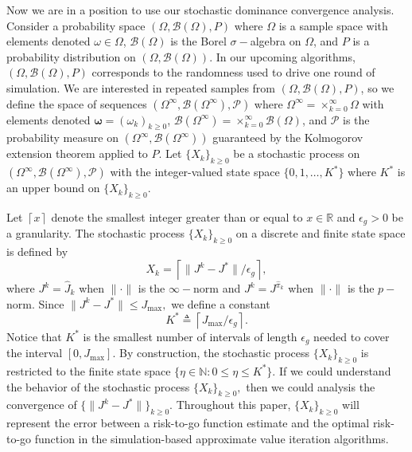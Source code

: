 \documentclass[12pt,technote,onecolumn]{IEEEtran}
\begin{document}
Now we are in a position to use our stochastic dominance convergence
analysis. Consider a probability space $(\Omega,\mathcal{B}(\Omega),P)$
where $\Omega$ is a sample space with elements denoted $\omega\in\Omega$,
$\mathcal{B}\left(\Omega\right)$ is the Borel $\sigma-$algebra on
$\Omega$, and $P$ is a probability distribution on $\left(\Omega,\mathcal{B}(\Omega)\right)$.
In our upcoming algorithms, $\left(\Omega,\mathcal{B}(\Omega),P\right)$
corresponds to the randomness used to drive one round of simulation.
We are interested in repeated samples from $\left(\Omega,\mathcal{B}(\Omega),P\right)$,
so we define the space of sequences $(\Omega^{\infty},\mathcal{B}(\Omega^{\infty}),\mathcal{P})$
where $\Omega^{\infty}=\times_{k=0}^{\infty}\Omega$ with elements
denoted $\boldsymbol{\omega}=(\omega_{k})_{k\geq0}$, $\mathcal{B}(\Omega^{\infty})=\times_{k=0}^{\infty}\mathcal{B}(\Omega)$,
and $\mathcal{P}$ is the probability measure on $(\Omega^{\infty},\mathcal{B}(\Omega^{\infty}))$
guaranteed by the Kolmogorov extension theorem applied to $P$. Let
$\{ X_{k}\} _{k\geq0}$ be a stochastic process on $(\Omega^{\infty},\mathcal{B}(\Omega^{\infty}),\mathcal{P})$
with the integer-valued state space $\{ 0,1,\ldots,K^{*}\} $
where $K^{*}$ is an upper bound on $\{ X_{k}\} _{k\geq0}$.

Let $\left\lceil x\right\rceil $ denote the smallest integer greater
than or equal to $x\in\mathbb{R}$ and $\epsilon_{g}>0$ be a granularity.
The stochastic process $\{ X_{k}\} _{k\geq0}$ on a discrete
and finite state space is defined by 
\[
X_{k}=\left\lceil \|J^{k}-J^{*}\|/\epsilon_{g}\right\rceil ,
\]
where $J^{k}=\widehat{J}_{k}$ when $\|\cdot\|$ is the $\infty-$norm
and $J^{k}=J^{\widehat{\pi}_{k}}$ when $\|\cdot\|$ is the $p-$norm.
Since $\|J^{k}-J^{*}\|\leq J_{\max},$ we define a constant 
$$
K^{*}\triangleq\left\lceil {J_{\max}}/{\epsilon_{g}}\right\rceil .
$$
Notice that $K^{*}$ is the smallest number of intervals of length
$\epsilon_{g}$ needed to cover the interval $[0,J_{\max}].$
By construction, the stochastic process $\{ X_{k}\} _{k\geq0}$
is restricted to the finite state space $\{ \eta\in\mathbb{N}:0\leq\eta\leq K^{*}\} .$
If we could understand the behavior of the stochastic process $\{ X_{k}\} _{k\geq0},$
then we could analysis the convergence of $\{\|J^{k}-J^{*}\|\} _{k\geq0}.$
Throughout this paper, $\{ X_{k}\} _{k\geq0}$ will represent
the error between a risk-to-go function estimate and the optimal risk-to-go
function in the simulation-based approximate value iteration algorithms.
\end{document}
